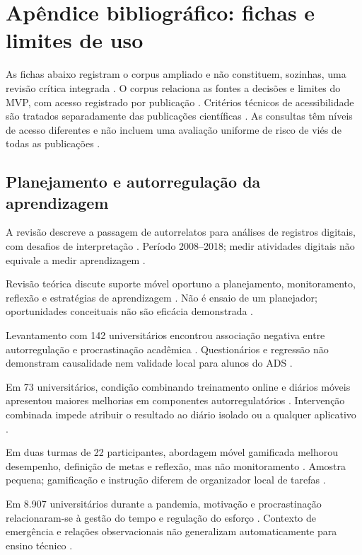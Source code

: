 \section{Apêndice bibliográfico: fichas e limites de uso}

As fichas abaixo registram o corpus ampliado e não constituem, sozinhas, uma revisão crítica integrada \citep{SU11}. O corpus relaciona as fontes a decisões e limites do MVP, com acesso registrado por publicação . Critérios técnicos de acessibilidade são tratados separadamente das publicações científicas \citep{wcag}. As consultas têm níveis de acesso diferentes e não incluem uma avaliação uniforme de risco de viés de todas as publicações .

\subsection{Planejamento e autorregulação da aprendizagem}

A revisão descreve a passagem de autorrelatos para análises de registros digitais, com desafios de interpretação \citep{education_araka2020}. Período 2008–2018; medir atividades digitais não equivale a medir aprendizagem \citep{education_araka2020}.

Revisão teórica discute suporte móvel oportuno a planejamento, monitoramento, reflexão e estratégias de aprendizagem \citep{education_baars2022}. Não é ensaio de um planejador; oportunidades conceituais não são eficácia demonstrada \citep{education_baars2022}.

Levantamento com 142 universitários encontrou associação negativa entre autorregulação e procrastinação acadêmica \citep{education_brahma2023}. Questionários e regressão não demonstram causalidade nem validade local para alunos do ADS \citep{education_brahma2023}.

Em 73 universitários, condição combinando treinamento online e diários móveis apresentou maiores melhorias em componentes autorregulatórios \citep{education_broadbent2020}. Intervenção combinada impede atribuir o resultado ao diário isolado ou a qualquer aplicativo \citep{education_broadbent2020}.

Em duas turmas de 22 participantes, abordagem móvel gamificada melhorou desempenho, definição de metas e reflexão, mas não monitoramento \citep{education_chen2024}. Amostra pequena; gamificação e instrução diferem de organizador local de tarefas \citep{education_chen2024}.

Em 8.907 universitários durante a pandemia, motivação e procrastinação relacionaram-se à gestão do tempo e regulação do esforço \citep{education_forstervold2022}. Contexto de emergência e relações observacionais não generalizam automaticamente para ensino técnico \citep{education_forstervold2022}.

